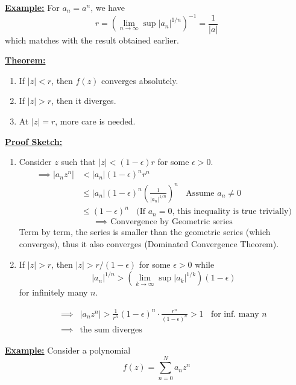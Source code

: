 \documentclass{article}
\begin{document}
\vskip 0.5cm
\underline{\textbf{Example:}} For $a_n = a^n$, we have
\[ r = \left( \lim_{n \rightarrow \infty} \sup |a_n|^{1/n} \right)^{-1} = \frac{1}{|a|}  \] which matches with the result obtained earlier.

\begin{dottedbox}
  \underline{\textbf{Theorem:}} 
  \begin{enumerate}
    \item If $|z| < r$, then $f(z)$ converges absolutely.
    \item If $|z| > r$, then it diverges.
    \item At $|z| = r$, more care is needed.
  \end{enumerate}

  \vskip 0.5cm
  \underline{\textbf{Proof Sketch:}} 
  \begin{enumerate}
    \item Consider $z$ such that $|z| < (1 - \epsilon)r$ for some $\epsilon > 0$.
    \begin{align*}
      \implies |a_n z^n| &< |a_n|(1-\epsilon)^n r^n \\
      &\leq |a_n| (1-\epsilon)^n \left(\frac{1}{|a_n|^{1/n}}\right)^n \;\;\text{ Assume $a_n \neq 0$}\\
      &\leq (1-\epsilon)^n \;\;\text{ (If $a_n = 0$, this  inequality is true trivially)}
    \end{align*}
    \[ \implies \text{ Convergence by Geometric series} \]
    Term by term, the series is smaller than the geometric series (which converges), thus it also converges (Dominated Convergence Theorem).

    \vskip 0.5cm
    \item If $|z| > r$, then $|z| > r/(1 - \epsilon)$ for some $\epsilon > 0$ while 
    \[ |a_n|^{1/n} > \left( \lim_{k \rightarrow \infty} \sup |a_k|^{1/k} \right) (1 - \epsilon) \] for infinitely many $n$.

    \begin{align*}
      \implies &|a_n z^n| > \frac{1}{r^n}(1-\epsilon)^n \cdot \frac{r^n}{(1-\epsilon)^n} > 1 \;\;\text{ for inf. many $n$} \\
      \implies &\text{the sum diverges}
    \end{align*}
  \end{enumerate}

\end{dottedbox}

\vskip 0.5cm
\underline{\textbf{Example:}} Consider a polynomial 
\[ f(z) = \sum_{n = 0}^{N} a_n z^n \]
\end{document}
